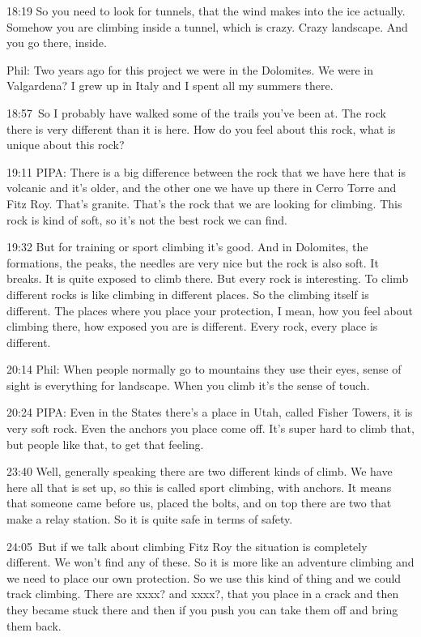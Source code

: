 18:19 So you need to look for tunnels, that the wind makes into the ice
actually. Somehow you are climbing inside a tunnel, which is crazy.
Crazy landscape. And you go there, inside.

Phil: Two years ago for this project we were in the Dolomites. We were
in Valgardena? I grew up in Italy and I spent all my summers there.

18:57~So I probably have walked some of the trails you've been at. The
rock there is very different than it is here. How do you feel about this
rock, what is unique about this rock?

19:11 PIPA: There is a big difference between the rock that we have here
that is volcanic and it's older, and the other one we have up there in
Cerro Torre and Fitz Roy. That's granite. That's the rock that we are
looking for climbing. This rock is kind of soft, so it's not the best
rock we can find.

19:32 But for training or sport climbing it's good. And in Dolomites,
the formations, the peaks, the needles are very nice but the rock is
also soft. It breaks. It is quite exposed to climb there. But every rock
is interesting. To climb different rocks is like climbing in different
places. So the climbing itself is different. The places where you place
your protection, I mean, how you feel about climbing there, how exposed
you are is different. Every rock, every place is different.

20:14 Phil: When people normally go to mountains they use their eyes,
sense of sight is everything for landscape. When you climb it's the
sense of touch.

20:24 PIPA: Even in the States there's a place in Utah, called Fisher
Towers, it is very soft rock. Even the anchors you place come off. It's
super hard to climb that, but people like that, to get that feeling.

23:40 Well, generally speaking there are two different kinds of climb.
We have here all that is set up, so this is called sport climbing, with
anchors. It means that someone came before us, placed the bolts, and on
top there are two that make a relay station. So it is quite safe in
terms of safety.

24:05~But if we talk about climbing Fitz Roy the situation is completely
different. We won't find any of these. So it is more like an adventure
climbing and we need to place our own protection. So we use this kind of
thing and we could track climbing. There are xxxx? and xxxx?, that you
place in a crack and then they became stuck there and then if you push
you can take them off and bring them back.

